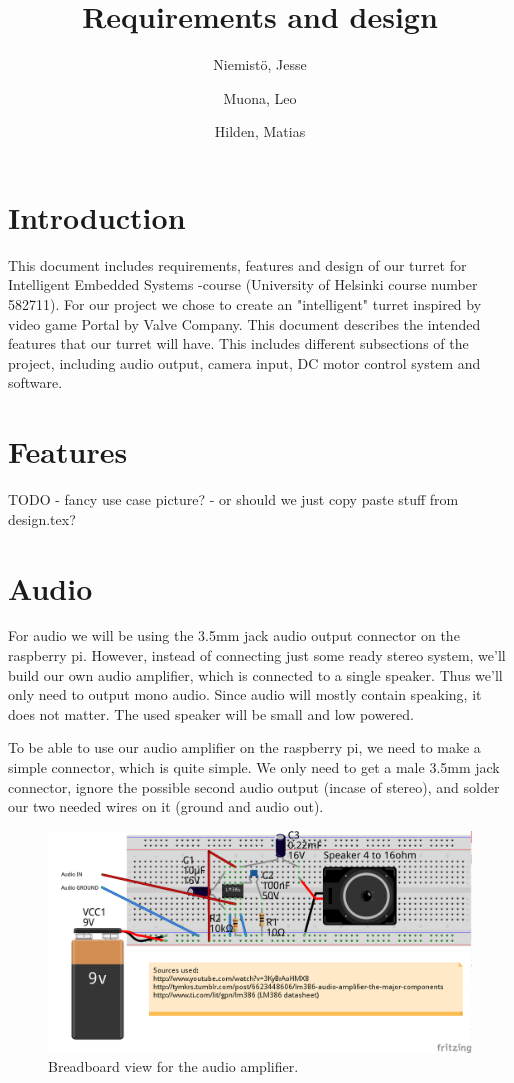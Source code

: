 \documentclass[english,11pt,twoside,a4paper]{article}
\begin{document}
\author{
  Niemistö, Jesse
  \and
  Muona, Leo
  \and
  Hilden, Matias
}
\title{Requirements and design}

\maketitle

\section{Introduction}
This document includes requirements, features and design of our turret for Intelligent Embedded Systems -course (University of Helsinki course number 582711). For our project we chose to create an "intelligent" turret inspired by video game Portal by Valve Company. This document describes the intended features that our turret will have. This includes different subsections of the project, including audio output, camera input, DC motor control system and software.

\section{Features}
TODO
- fancy use case picture?
- or should we just copy paste stuff from design.tex?

\section{Audio}

For audio we will be using the 3.5mm jack audio output connector on the raspberry pi. However, instead of connecting just some ready stereo system, we'll build our own audio amplifier, which is connected to a single speaker. Thus we'll only need to output mono audio. Since audio will mostly contain speaking, it does not matter. The used speaker will be small and low powered.

To be able to use our audio amplifier on the raspberry pi, we need to make a simple connector, which is quite simple. We only need to get a male 3.5mm jack connector, ignore the possible second audio output (incase of stereo), and solder our two needed wires on it (ground and audio out).

\begin{figure}
  \begin{center}
    \includegraphics[scale=0.75]{audio_amplifier_lm386_bb.png}
    \caption{Breadboard view for the audio amplifier.}
  \end{center}
  \label{lm386_bb}
\end{figure}
\end{document}
